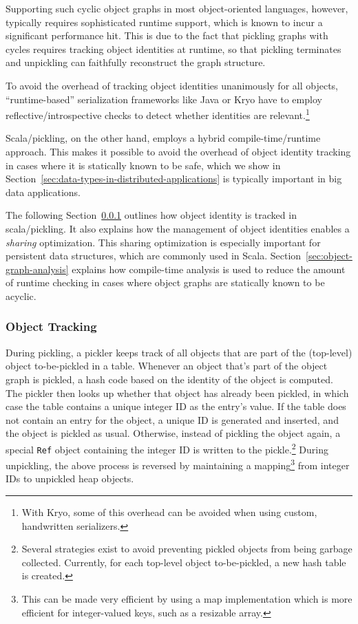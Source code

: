 \documentclass[preprint,10pt]{sigplanconf}
\theoremstyle{definition}
\theoremstyle{definition}
\begin{document}
Supporting such cyclic object graphs in most object-oriented languages,
however, typically requires sophisticated runtime support, which is known to
incur a significant performance hit. This is due to the fact that pickling
graphs with cycles requires tracking object identities at runtime, so that
pickling terminates and unpickling can faithfully reconstruct the graph
structure.

To avoid the overhead of tracking object identities unanimously for all
objects, ``runtime-based'' serialization frameworks like Java or Kryo have to
employ reflective/introspective checks to detect whether identities are
relevant.\footnote{With Kryo, some of this overhead can be avoided when using custom, handwritten serializers.}

Scala/pickling, on the other hand, employs a hybrid compile-time/runtime
approach. This makes it possible to avoid the overhead of object identity
tracking in cases where it is statically known to be safe, which we show in
Section~\ref{sec:data-types-in-distributed-applications} is typically
important in big data applications.

The following Section~\ref{sec:object-tracking} outlines how object identity
is tracked in scala/pickling. It also explains how the management of object
identities enables a {\em sharing} optimization. This sharing optimization is
especially important for persistent data structures, which are commonly used
in Scala. Section~\ref{sec:object-graph-analysis} explains how compile-time
analysis is used to reduce the amount of runtime checking in cases where
object graphs are statically known to be acyclic.

\subsubsection{Object Tracking}
\label{sec:object-tracking}

During pickling, a pickler keeps track of all objects that are part of the
(top-level) object to-be-pickled in a table. Whenever an object that's part of
the object graph is pickled, a hash code based on the identity of the object
is computed. The pickler then looks up whether that object has already been
pickled, in which case the table contains a unique integer ID as the entry's
value. If the table does not contain an entry for the object, a unique ID is
generated and inserted, and the object is pickled as usual. Otherwise, instead
of pickling the object again, a special \verb|Ref| object containing the integer ID
is written to the pickle.\footnote{Several strategies exist to avoid preventing pickled objects from being garbage collected. Currently, for each top-level object to-be-pickled, a new hash table is created.}
During unpickling, the above process is reversed by maintaining a
mapping\footnote{This can be made very efficient by using a map implementation which is more efficient for integer-valued keys, such as a resizable array.}
from integer IDs to unpickled heap objects.
\end{document}
